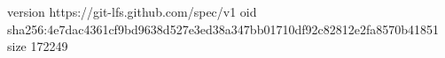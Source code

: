 version https://git-lfs.github.com/spec/v1
oid sha256:4e7dac4361cf9bd9638d527e3ed38a347bb01710df92c82812e2fa8570b41851
size 172249
